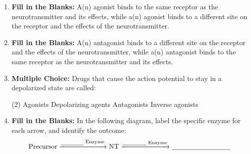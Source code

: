 \begin{enumerate}[label=\textbf{Q3.1.\arabic*}]
    \item \textbf{Fill in the Blanks:} A(n) \underline{\hspace{3cm}} agonist binds to the same receptor as the neurotransmitter and \underline{\hspace{3cm}} its effects, while a(n) \underline{\hspace{3cm}} agonist binds to a different site on the receptor and \underline{\hspace{3cm}} the effects of the neurotransmitter.

    \item \textbf{Fill in the Blanks:} A(n) \underline{\hspace{3cm}} antagonist binds to a different site on the receptor and \underline{\hspace{3cm}} the effects of the neurotransmitter, while a(n) \underline{\hspace{3cm}} antagonist binds to the same receptor as the neurotransmitter and \underline{\hspace{3cm}} its effects.

    \item \textbf{Multiple Choice:} Drugs that cause the action potential to stay in a depolarized state are called:
        \begin{tasks}[label=\textcolor{\documentTheme}{(\Alph*)}, item-format=\color{\documentTheme}, label-width=1.5em, item-indent=1.7em](2)
            \task Agonists
            \task Depolarizing agents
            \task Antagonists
            \task Inverse agonists
        \end{tasks}

    
    \item \textbf{Fill in the Blanks:} In the following diagram, label the specific enzyme for each arrow, and identify the outcome:
    \[
        \text{Precursor} \xrightarrow{\text{\underline{\phantom{Synthetic}} Enzyme}} \text{NT} \xrightarrow{\text{\underline{\phantom{Metabolic}} Enzyme}} \text{\underline{\phantom{Inactive Metabolite}}}
    \]


\end{enumerate}

